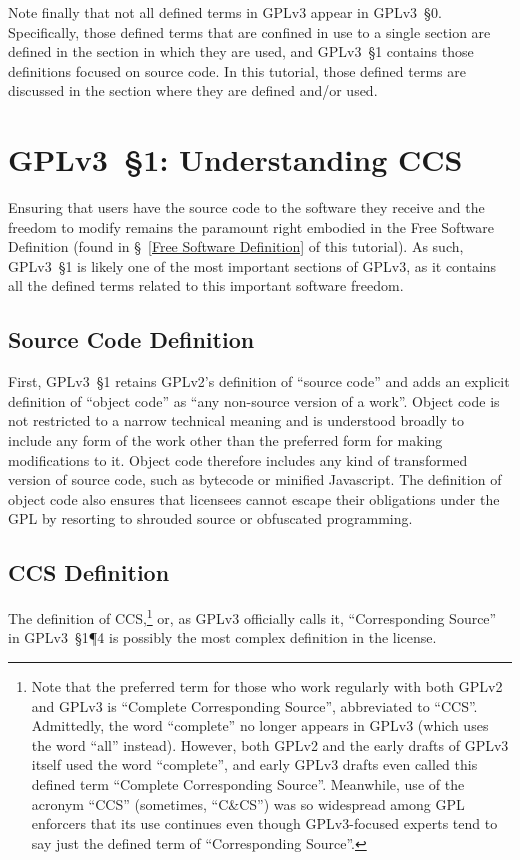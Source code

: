 Note finally that not all defined terms in GPLv3 appear in GPLv3~\S0.
Specifically, those defined terms that are confined in use to a single
section are defined in the section in which they are used, and GPLv3~\S1
contains those definitions focused on source code.  In this tutorial, those
defined terms are discussed in the section where they are defined and/or
used.

\section{GPLv3~\S1: Understanding CCS}
\label{GPLv3s1}

Ensuring that users have the source code to the software they receive and the
freedom to modify remains the paramount right embodied in the Free Software
Definition (found in \S~\ref{Free Software Definition} of this tutorial).  As
such, GPLv3~\S1 is likely one of the most important sections of GPLv3, as it
contains all the defined terms related to this important software freedom.

\subsection{Source Code Definition}

First, GPLv3~\S1 retains GPLv2's definition of ``source code'' and adds an
explicit definition of ``object code'' as ``any non-source version of a
work''.  Object code is not restricted to a narrow technical meaning and is
understood broadly to include any form of the work other than the preferred
form for making modifications to it.  Object code therefore includes any kind
of transformed version of source code, such as bytecode or minified
Javascript.  The definition of object code also ensures that licensees cannot
escape their obligations under the GPL by resorting to shrouded source or
obfuscated programming.

\subsection{CCS Definition}
\label{CCS Definition}

The definition of CCS,\footnote{Note that the preferred term for those who
  work regularly with both GPLv2 and GPLv3 is ``Complete Corresponding
  Source'', abbreviated to ``CCS''.  Admittedly, the word ``complete'' no
  longer appears in GPLv3 (which uses the word ``all'' instead).  However,
  both GPLv2 and the early drafts of GPLv3 itself used the word ``complete'',
  and early GPLv3 drafts even called this defined term ``Complete
  Corresponding Source''.  Meanwhile, use of the acronym ``CCS'' (sometimes,
  ``C\&CS'') was so widespread among GPL enforcers that its use continues
  even though GPLv3-focused experts tend to say just the defined term of
  ``Corresponding Source''.} or, as GPLv3 officially calls it,
``Corresponding Source'' in GPLv3~\S1\P4 is possibly the most complex
definition in the license.

